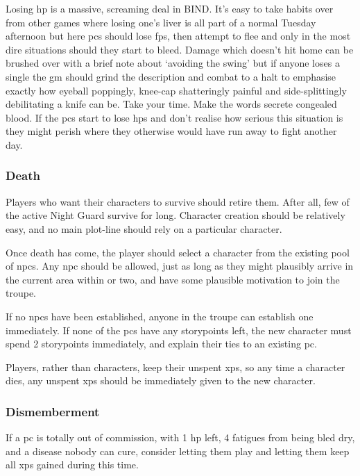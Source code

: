 \begin{multicols}{2}
Losing \gls{hp} is a massive, screaming deal in BIND.
It's easy to take habits over from other games where losing one's liver is all part of a normal Tuesday afternoon but here \glspl{pc} should lose \glspl{fp}, then attempt to flee and only in the most dire situations should they start to bleed.
Damage which doesn't hit home can be brushed over with a brief note about `avoiding the swing' but if anyone loses a single  the \gls{gm} should grind the description and combat to a halt to emphasise exactly how eyeball poppingly, knee-cap shatteringly painful and side-splittingly debilitating a knife can be.
Take your time.
Make the words secrete congealed blood.
If the \glspl{pc} start to lose \glspl{hp} and don't realise how serious this situation is they might perish where they otherwise would have run away to fight another day.

\subsubsection{Death}
\label{pcdeath}

Players who want their characters to survive should retire them.
After all, few of the active Night Guard survive for long.
Character creation should be relatively easy, and no main plot-line should rely on a particular character.

Once death has come, the player should select a character from the existing pool of \glspl{npc}\iftoggle{stories}{brought into the world with \glspl{storypoint}}{}.
Any \gls{npc} should be allowed, just as long as they might plausibly arrive in the current area within  or two, and have some plausible motivation to join the troupe.

If no \glspl{npc} have been established, anyone in the troupe can establish one immediately.
If none of the \glspl{pc} have any \glspl{storypoint} left, the new character must spend 2 \glspl{storypoint} immediately, and explain their ties to an existing \gls{pc}.

Players, rather than characters, keep their unspent \glspl{xp}, so any time a character dies, any unspent \glspl{xp} should be immediately given to the new character.

\subsubsection{Dismemberment}

If a \gls{pc} is totally out of commission, with 1 \gls{hp} left, 4 \glspl{fatigue} from being bled dry, and a disease nobody can cure, consider letting them play  and letting them keep all \glspl{xp} gained during this time.

\end{multicols}

